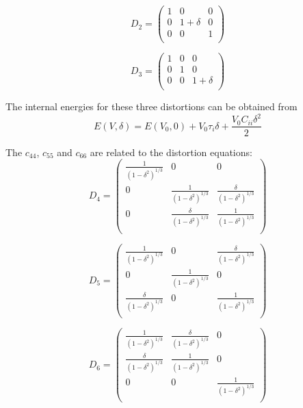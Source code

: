 \begin{equation}
\label{eq_D2}
	D_2 = \begin{pmatrix}
						1 & 0 & 0 \\
						0 & 1+\delta & 0 \\
						0 & 0 & 1 \\
					\end{pmatrix}
\end{equation}

\begin{equation}
\label{eq_D3}
D_3 =  \begin{pmatrix}
						1 & 0 & 0 \\
						0 & 1 & 0 \\
						0 & 0 & 1+\delta \\
						\end{pmatrix}
\end{equation}

The internal energies for these three distortions can be obtained from 
\begin{equation}
\label{eq_d1d2d3}
E(V,\delta) = E(V_0,0) + V_0\tau_i \delta + \frac{V_0C_{ii}\delta^2}{2}
\end{equation}

The $c_{44}$, $c_{55}$ and $c_{66}$ are related to the distortion equations:
\begin{equation}
\label{eq_D4}
	D_4 = \begin{pmatrix}
						\frac{1}{(1-\delta^2)^{1/3}} & 0 & 0 \\
						0 & \frac{1}{(1-\delta^2)^{1/3}} & \frac{\delta}{(1-\delta^2)^{1/3}} \\
						0 & \frac{\delta}{(1-\delta^2)^{1/3}} & \frac{1}{(1-\delta^2)^{1/3}} \\
						\end{pmatrix}
\end{equation} 

\begin{equation}
\label{eq_D5}
	D_5 =  \begin{pmatrix}
						\frac{1}{(1-\delta^2)^{1/3}} & 0 & \frac{\delta}{(1-\delta^2)^{1/3}} \\
						0 & \frac{1}{(1-\delta^2)^{1/3}} & 0 \\
						\frac{\delta}{(1-\delta^2)^{1/3}} & 0 & \frac{1}{(1-\delta^2)^{1/3}} \\
						\end{pmatrix}
\end{equation}

\begin{equation}\label{eq_D6}
						D_6 = \begin{pmatrix}
						\frac{1}{(1-\delta^2)^{1/3}} & \frac{\delta}{(1-\delta^2)^{1/3}} & 0 \\
						\frac{\delta}{(1-\delta^2)^{1/3}} & \frac{1}{(1-\delta^2)^{1/3}} & 0 \\
						0 & 0 & \frac{1}{(1-\delta^2)^{1/3}} \\
						\end{pmatrix}
\end{equation}	


